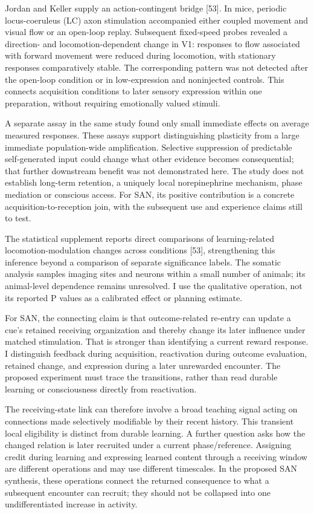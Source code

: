 \documentclass[
  american,
  11pt,
  letterpaper,
]{article}
\begin{document}
Jordan and Keller supply an action-contingent bridge {[}53{]}. In mice, periodic locus-coeruleus (LC) axon stimulation accompanied either coupled movement and visual flow or an open-loop replay. Subsequent fixed-speed probes revealed a direction- and locomotion-dependent change in V1: responses to flow associated with forward movement were reduced during locomotion, with stationary responses comparatively stable. The corresponding pattern was not detected after the open-loop condition or in low-expression and noninjected controls. This connects acquisition conditions to later sensory expression within one preparation, without requiring emotionally valued stimuli.

A separate assay in the same study found only small immediate effects on average measured responses. These assays support distinguishing plasticity from a large immediate population-wide amplification. Selective suppression of predictable self-generated input could change what other evidence becomes consequential; that further downstream benefit was not demonstrated here. The study does not establish long-term retention, a uniquely local norepinephrine mechanism, phase mediation or conscious access. For SAN, its positive contribution is a concrete acquisition-to-reception join, with the subsequent use and experience claims still to test.

The statistical supplement reports direct comparisons of learning-related locomotion-modulation changes across conditions {[}53{]}, strengthening this inference beyond a comparison of separate significance labels. The somatic analysis samples imaging sites and neurons within a small number of animals; its animal-level dependence remains unresolved. I use the qualitative operation, not its reported P values as a calibrated effect or planning estimate.

For SAN, the connecting claim is that outcome-related re-entry can update a cue's retained receiving organization and thereby change its later influence under matched stimulation. That is stronger than identifying a current reward response. I distinguish feedback during acquisition, reactivation during outcome evaluation, retained change, and expression during a later unrewarded encounter. The proposed experiment must trace the transitions, rather than read durable learning or consciousness directly from reactivation.

The receiving-state link can therefore involve a broad teaching signal acting on connections made selectively modifiable by their recent history. This transient local eligibility is distinct from durable learning. A further question asks how the changed relation is later recruited under a current phase/reference. Assigning credit during learning and expressing learned content through a receiving window are different operations and may use different timescales. In the proposed SAN synthesis, these operations connect the returned consequence to what a subsequent encounter can recruit; they should not be collapsed into one undifferentiated increase in activity.
\end{document}
